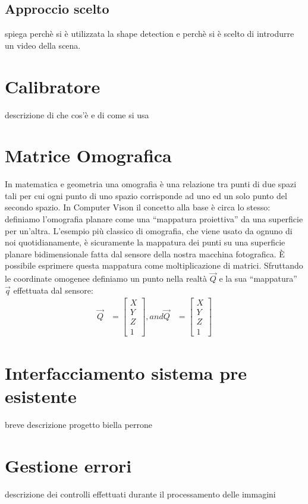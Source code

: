 \documentclass[twoside]{supsistudent}
\begin{document}
\subsection{Approccio scelto}
spiega perchè si è utilizzata la shape detection e perchè si è scelto di introdurre un video della scena.

\section{Calibratore}
descrizione di che cos'è e di come si usa

\section{Matrice Omografica}
In matematica e geometria una omografia è una relazione tra punti di due spazi tali per cui ogni punto di uno spazio corrisponde ad uno ed un solo
punto del secondo spazio. In Computer Vison il concetto alla base è circa lo stesso: definiamo l'omografia planare come una “mappatura proiettiva” da
una superficie per un’altra. L’esempio più classico di omografia, che viene usato da ognuno di noi quotidianamente, è sicuramente la mappatura dei
punti su una superficie planare bidimensionale fatta dal sensore della nostra macchina fotografica. È possibile esprimere questa mappatura come
moltiplicazione di matrici. Sfruttando le coordinate omogenee definiamo un punto nella realtà $\vec{Q}$ e la sua “mappatura” $\vec{q}$ effettuata dal sensore:
\begin{align}
  \vec{Q} &= \begin{bmatrix}
         X \\
         Y \\
         Z \\
         1
       \end{bmatrix}, and 
       \vec{Q} &= \begin{bmatrix}
        X \\
        Y \\
        Z \\
        1
      \end{bmatrix}
\end{align}
\section{Interfacciamento sistema pre esistente}
breve descrizione progetto biella perrone 

\section{Gestione errori}
descrizione dei controlli effettuati durante il processamento delle immagini
\end{document}

